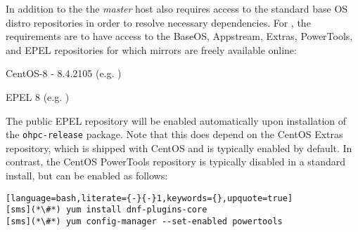 In addition to the \OHPC{} 
\iftoggle{isxCAT}{and \xCAT{} package repositories,}{package repository,}
the {\em master} host also requires access to the standard base OS distro
repositories in order to resolve necessary dependencies. For \baseOS{}, the
requirements are to have access to the BaseOS, Appstream, Extras, PowerTools,
and EPEL repositories for which mirrors are freely available online:

\begin{itemize*}
\item CentOS-8 - 8.4.2105
  (e.g. \href{http://mirror.centos.org/centos-8/8/}
             {\color{blue}{http://mirror.centos.org/centos-8/8/}} )
\item EPEL 8 (e.g. \href{http://download.fedoraproject.org/pub/epel/8/}
                        {\color{blue}{http://download.fedoraproject.org/pub/epel/8/}} )
\end{itemize*}

\noindent The public EPEL repository will be enabled automatically upon
installation of the \texttt{ohpc-release} package. Note that this does depend
on the CentOS Extras repository, which is shipped with CentOS and is typically
enabled by default.  In contrast, the CentOS PowerTools repository is typically
disabled in a standard install, but can be enabled as follows:

\begin{lstlisting}[language=bash,literate={-}{-}1,keywords={},upquote=true]
[sms](*\#*) yum install dnf-plugins-core
[sms](*\#*) yum config-manager --set-enabled powertools
\end{lstlisting}
